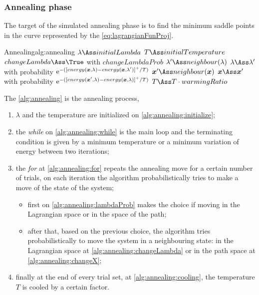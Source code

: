 \documentclass[dissertation.tex]{subfiles}
\begin{document}
\subsubsection{Annealing phase}
The target of the simulated annealing phase is to find the minimum
saddle points in
the curve represented by the
\cref{eq:lagrangianFunProj}.
\begin{algo}{Annealing}{alg:annealing}
  \State $\lambda\Ass initialLambda$\label{alg:annealing:initialize}
  \State $T\Ass initialTemperature$
  \label{alg:annealing:while}
  \label{alg:annealing:for}
  \State $changeLambda\Ass\True$ with $changeLambdaProb$\label{alg:annealing:lambdaProb}
  \State $\lambda'\Ass neighbour(\lambda)$\label{alg:annealing:changeLambda}
  \State $\lambda\Ass \lambda'$ with probability $\mathrm{e}^{-([energy(\boldsymbol{x},\lambda)-energy(\boldsymbol{x},\lambda')]^+/T)}$
  \Else
  \State $\ve{x}'\Ass neighbour(\ve{x})$\label{alg:annealing:changeX}
  \State $\ve{x}\Ass \ve{x}'$ with probability $\mathrm{e}^{-([energy(\boldsymbol{x}',\lambda)-energy(\boldsymbol{x},\lambda)]^+/T)}$
  \EndIf
  \EndFor
  \State $T\Ass T\cdot warmingRatio$\label{alg:annealing:cooling}
  \EndWhile
  \EndProcedure
\end{algo}

The \cref{alg:annealing} is the annealing process,
\begin{enumerate}
\item $\lambda$ and the
  temperature are initialized on
  \cref{alg:annealing:initialize};
\item the \emph{while} on
  \cref{alg:annealing:while} is the main loop and the terminating
  condition is given by a minimum temperature or a minimum variation of
  energy between two iterations;
\item the \emph{for} at
  \cref{alg:annealing:for} repeats the annealing move for a certain
  number of trials, on each iteration the algorithm probabilistically
  tries to make a move of the state of the system;
  \begin{itemize}
  \item first on
    \cref{alg:annealing:lambdaProb} makes the choice if moving in the
    Lagrangian space or in the space of the path;
  \item after that, based on the previous
    choice, the algorithm tries probabilistically to move the system
    in a neighbouring
    state: in the
    Lagrangian space at
    \cref{alg:annealing:changeLambda} or in the path space at
    \cref{alg:annealing:changeX};
  \end{itemize}
\item finally at the end of every trial set,
  at \cref{alg:annealing:cooling}, the temperature $T$ is cooled by
  a certain factor.
\end{enumerate}
\end{document}
